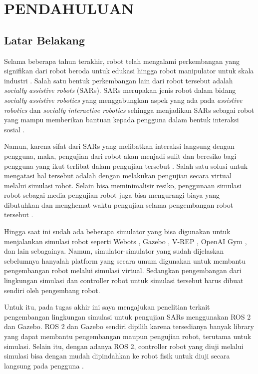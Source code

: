 \section{PENDAHULUAN}

\subsection{Latar Belakang}

Selama beberapa tahun terakhir, robot telah mengalami perkembangan yang signifikan dari robot beroda untuk edukasi \citep{Goncalves2009} hingga robot manipulator untuk skala industri \citep{Blatnicky2020}.
Salah satu bentuk perkembangan lain dari robot tersebut adalah \emph{socially assistive robots} (SARs).
SARs merupakan jenis robot dalam bidang \emph{socially assistive robotics} yang menggabungkan aspek yang ada pada \emph{assistive robotics} dan \emph{socially interactive robotics} sehingga menjadikan SARs sebagai robot yang mampu memberikan bantuan kepada pengguna dalam bentuk interaksi sosial \citep{Seifer2005}.

Namun, karena sifat dari SARs yang melibatkan interaksi langsung dengan pengguna, maka, pengujian dari robot akan menjadi sulit dan beresiko bagi pengguna yang ikut terlibat dalam pengujian tersebut \citep{Erickson2020}.
Salah satu solusi untuk mengatasi hal tersebut adalah dengan melakukan pengujian secara virtual melalui simulasi robot.
Selain bisa meminimalisir resiko, penggunaan simulasi robot sebagai media pengujian robot juga bisa mengurangi biaya yang dibutuhkan dan menghemat waktu pengujian selama pengembangan robot tersebut \citep{Takaya2016}.

Hingga saat ini sudah ada beberapa simulator yang bisa digunakan untuk menjalankan simulasi robot seperti Webots \citep{Michel2004}, Gazebo \citep{Koenig2004}, V-REP \citep{Rohmer2013}, OpenAI Gym \citep{Brockman2016}, dan lain sebagainya.
Namun, simulator-simulator yang sudah dijelaskan sebelumnya hanyalah platform yang secara umum digunakan untuk membantu pengembangan robot melalui simulasi virtual.
Sedangkan pengembangan dari lingkungan simulasi dan controller robot untuk simulasi tersebut harus dibuat sendiri oleh pengembang robot.

Untuk itu, pada tugas akhir ini saya mengajukan penelitian terkait pengembangan lingkungan simulasi untuk pengujian SARs menggunakan ROS 2 dan Gazebo.
ROS 2 dan Gazebo sendiri dipilih karena tersedianya banyak library yang dapat membantu pengembangan maupun pengujian robot, terutama untuk simulasi.
Selain itu, dengan adanya ROS 2, controller robot yang diuji melalui simulasi bisa dengan mudah dipindahkan ke robot fisik untuk diuji secara langsung pada pengguna \citep{Takaya2016}.

